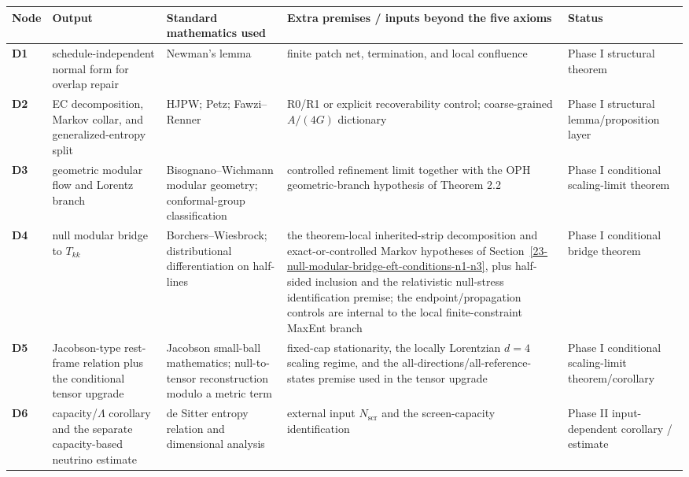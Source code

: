 \begingroup
\scriptsize
{\def\LTcaptype{none}
\setlength{\tabcolsep}{2pt}
\begin{longtable}[]{@{}>{\RaggedRight\arraybackslash}p{}>{\RaggedRight\arraybackslash}p{}>{\RaggedRight\arraybackslash}p{}>{\RaggedRight\arraybackslash}p{}>{\RaggedRight\arraybackslash}p{}@{}}
\toprule\noalign{}
Node & Output & Standard mathematics used & Extra premises / inputs beyond the five axioms & Status \\
\midrule\noalign{}
\endhead
\bottomrule\noalign{}
\endlastfoot
\textbf{D1} & schedule-independent normal form for overlap repair & Newman's lemma & finite patch net, termination, and local confluence & Phase I structural theorem \\
\textbf{D2} & EC decomposition, Markov collar, and generalized-entropy split & HJPW; Petz; Fawzi--Renner & R0/R1 or explicit recoverability control; coarse-grained \(A/(4G)\) dictionary & Phase I structural lemma/proposition layer \\
\textbf{D3} & geometric modular flow and Lorentz branch & Bisognano--Wichmann modular geometry; conformal-group classification & controlled refinement limit together with the OPH geometric-branch hypothesis of Theorem 2.2 & Phase I conditional scaling-limit theorem \\
\textbf{D4} & null modular bridge to \(T_{kk}\) & Borchers--Wiesbrock; distributional differentiation on half-lines & the theorem-local inherited-strip decomposition and exact-or-controlled Markov hypotheses of Section~\ref{23-null-modular-bridge-eft-conditions-n1-n3}, plus half-sided inclusion and the relativistic null-stress identification premise; the endpoint/propagation controls are internal to the local finite-constraint MaxEnt branch & Phase I conditional bridge theorem \\
\textbf{D5} & Jacobson-type rest-frame relation plus the conditional tensor upgrade & Jacobson small-ball mathematics; null-to-tensor reconstruction modulo a metric term & fixed-cap stationarity, the locally Lorentzian \(d=4\) scaling regime, and the all-directions/all-reference-states premise used in the tensor upgrade & Phase I conditional scaling-limit theorem/corollary \\
\textbf{D6} & capacity/\(\Lambda\) corollary and the separate capacity-based neutrino estimate & de Sitter entropy relation and dimensional analysis & external input \(N_{\mathrm{scr}}\) and the screen-capacity identification & Phase II input-dependent corollary / estimate \\

\end{longtable}}
